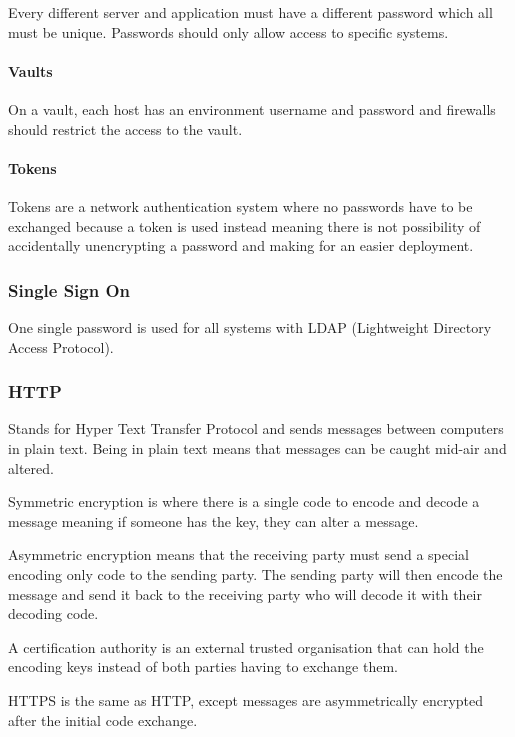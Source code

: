 Every different server and application must have a different password which all must be unique.
Passwords should only allow access to specific systems.

\paragraph{Vaults}\label{par:vaults}

On a vault, each host has an environment username and password and firewalls should restrict the access to the vault.

\paragraph{Tokens}\label{par:tokens}

Tokens are a network authentication system where no passwords have to be exchanged because a token is used instead meaning there is not possibility of accidentally unencrypting a password and making for an easier deployment.

\subsubsection{Single Sign On}\label{ssub:single_sign_on}

One single password is used for all systems with LDAP (Lightweight Directory Access Protocol).

\subsubsection{HTTP}\label{ssub:http}

Stands for Hyper Text Transfer Protocol and sends messages between computers in plain text.
Being in plain text means that messages can be caught mid-air and altered.

Symmetric encryption is where there is a single code to encode and decode a message meaning if someone has the key, they can alter a message.

Asymmetric encryption means that the receiving party must send a special encoding only code to the sending party.
The sending party will then encode the message and send it back to the receiving party who will decode it with their decoding code.

A certification authority is an external trusted organisation that can hold the encoding keys instead of both parties having to exchange them.

HTTPS is the same as HTTP, except messages are asymmetrically encrypted after the initial code exchange.

